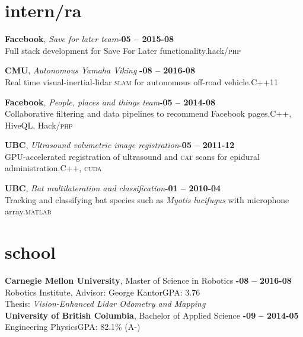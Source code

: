 \documentclass[margin,10pt]{res}
\begin{document}
\begin{resume}
\section{\sc \lsstyle intern/ra}
    \textbf{Facebook}, \textit{Save for later team}\hfill \textsc{\bfseries{}-05 -- 2015-08}\\
    Full stack development for Save For Later functionality.\hfill hack/\textsc{php}

    \textbf{CMU}, \textit{Autonomous Yamaha Viking} \hfill \textsc{\bfseries{}-08 -- 2016-08}\\
    Real time visual-inertial-lidar \textsc{slam} for autonomous off-road vehicle.\hfill C++11

    \textbf{Facebook}, \textit{People, places and things team}\hfill \textsc{\bfseries{}-05 -- 2014-08}\\
    Collaborative filtering and data pipelines to recommend Facebook pages.\hfill C++, HiveQL, Hack/\textsc{php}

    \textbf{UBC}, \textit{Ultrasound volumetric image registration}\hfill \textsc{\bfseries{}-05 -- 2011-12}\\
    GPU-accelerated registration of ultrasound and \textsc{cat} scans for epidural administration.\hfill C++, \textsc{cuda}

    \textbf{UBC}, \textit{Bat multilateration and classification}\hfill \textsc{\bfseries{}-01 -- 2010-04}\\
    Tracking and classifying bat species such as {\em Myotis lucifugus} with microphone array.\hfill \textsc{matlab}

\section{\sc \lsstyle school}
    \textbf{Carnegie Mellon University}, Master of Science in Robotics \hfill \textsc{\bfseries{}-08 -- 2016-08}\\
    Robotics Institute, Advisor: George Kantor\hfill GPA: 3.76\\
    Thesis: \textit{Vision-Enhanced Lidar Odometry and Mapping}\vspace{3pt}\\
    \textbf{University of British Columbia}, Bachelor of Applied Science \hfill \textsc{\bfseries{}-09 -- 2014-05}\\
    Engineering Physics\hfill GPA: 82.1\% (A-)%

\end{resume}
\end{document}
